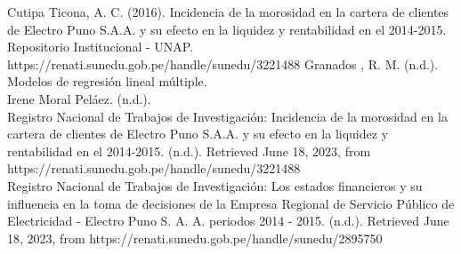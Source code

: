 \documentclass{article}
\begin{document}
Cutipa Ticona, A. C. (2016). Incidencia de la morosidad en la cartera de clientes de Electro Puno S.A.A. y su efecto en la liquidez y rentabilidad en el 2014-2015. Repositorio Institucional - UNAP. https://renati.sunedu.gob.pe/handle/sunedu/3221488
Granados , R. M. (n.d.). Modelos de regresión lineal múltiple. 
\\

Irene Moral Peláez. (n.d.).
\\

Registro Nacional de Trabajos de Investigación: Incidencia de la morosidad en la cartera de clientes de Electro Puno S.A.A. y su efecto en la liquidez y rentabilidad en el 2014-2015. (n.d.). Retrieved June 18, 2023, from https://renati.sunedu.gob.pe/handle/sunedu/3221488 
\\

Registro Nacional de Trabajos de Investigación: Los estados financieros y su influencia en la toma de decisiones de la Empresa Regional de Servicio Público de Electricidad - Electro Puno S. A. A. periodos 2014 - 2015. (n.d.). Retrieved June 18, 2023, from https://renati.sunedu.gob.pe/handle/sunedu/2895750
\end{document}
